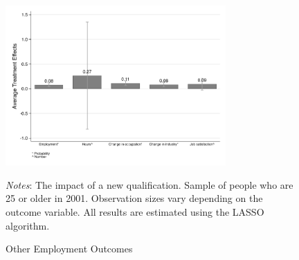 \documentclass[12pt, a4paper]{article}
\begin{document}
\begin{figure}[H]
\centering
\caption{Other Employment Outcomes}
\vspace{0.5cm}
  \label{fig:empl}
    \includegraphics[width=0.75\textwidth]{_figures/SPRC_fig5_empltr.pdf}
\parbox{1\textwidth}{\footnotesize{\textit{Notes}: The impact of a new qualification. Sample of people who are 25 or older in 2001. Observation sizes vary depending on the outcome variable. All results are estimated using the LASSO algorithm.}}
\end{figure}



\end{document}
